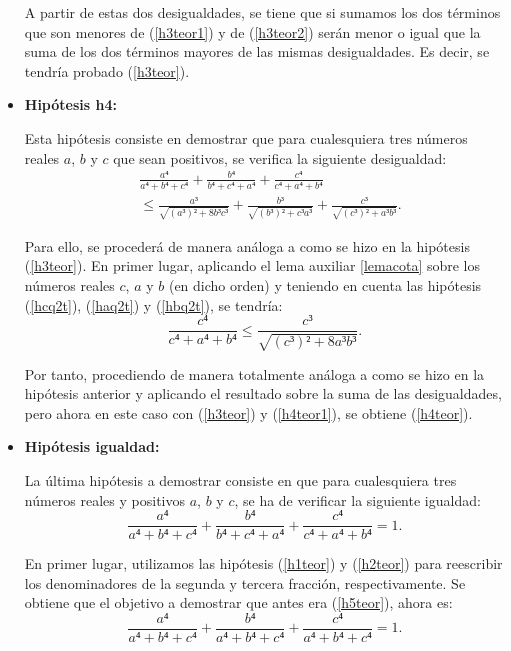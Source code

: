 \begin{demostracion}
\begin{itemize}
    A partir de estas dos desigualdades, se tiene que si sumamos los dos
    términos que son menores de (\ref{h3teor1}) y de (\ref{h3teor2})
    serán menor o igual que la suma de los dos términos mayores de las
    mismas desigualdades. Es decir, se tendría probado (\ref{h3teor}).

  \item \textbf{Hipótesis h4:}

    Esta hipótesis consiste en demostrar que para cualesquiera tres números
    reales \(a\), \(b\) y \(c\) que sean positivos, se verifica la
    siguiente desigualdad:
    \begin{align*}\label{h4teor}\tag{h4}
      & \frac{a⁴}{a⁴+b⁴+c⁴}+\frac{b⁴}{b⁴+c⁴+a⁴}+\frac{c⁴}{c⁴+a⁴+b⁴} \\
      & ≤ \frac{a³}{\sqrt{(a³)²+8b³c³}}+\frac{b³}{\sqrt{(b³)²+c³a³}}+
          \frac{c³}{\sqrt{(c³)²+a³b³}}.
    \end{align*}

    Para ello, se procederá de manera análoga a como se hizo en la
    hipótesis (\ref{h3teor}). En primer lugar, aplicando el lema auxiliar
    \ref{lemacota} sobre los números reales \(c\), \(a\) y \(b\) (en dicho
    orden) y teniendo en cuenta las hipótesis (\ref{hcq2t}), (\ref{haq2t})
    y (\ref{hbq2t}), se tendría:
    \begin{equation}\label{h4teor1}
      \frac{c⁴}{c⁴+a⁴+b⁴} ≤ \frac{c³}{\sqrt{(c³)²+8a³b³}}.
    \end{equation}

    Por tanto, procediendo de manera totalmente análoga a como se hizo en
    la hipótesis anterior y aplicando el resultado sobre la suma de las
    desigualdades, pero ahora en este caso con (\ref{h3teor}) y
    (\ref{h4teor1}), se obtiene (\ref{h4teor}).

  \item \textbf{Hipótesis igualdad:}

    La última hipótesis a demostrar consiste en que para cualesquiera
    tres números reales y positivos \(a\), \(b\) y \(c\), se ha de
    verificar la siguiente igualdad:
    \begin{equation}\label{h5teor}\tag{igualdad}
      \frac{a⁴}{a⁴+b⁴+c⁴}+\frac{b⁴}{b⁴+c⁴+a⁴}+\frac{c⁴}{c⁴+a⁴+b⁴} = 1.
    \end{equation}

    En primer lugar, utilizamos las hipótesis (\ref{h1teor}) y
    (\ref{h2teor}) para reescribir los denominadores de la segunda y
    tercera fracción, respectivamente. Se obtiene que el objetivo a
    demostrar que antes era (\ref{h5teor}), ahora es:
    \begin{equation}\label{h5teor1}
      \frac{a⁴}{a⁴+b⁴+c⁴}+\frac{b⁴}{a⁴+b⁴+c⁴}+\frac{c⁴}{a⁴+b⁴+c⁴} = 1.
    \end{equation}


\end{itemize}
\end{demostracion}
